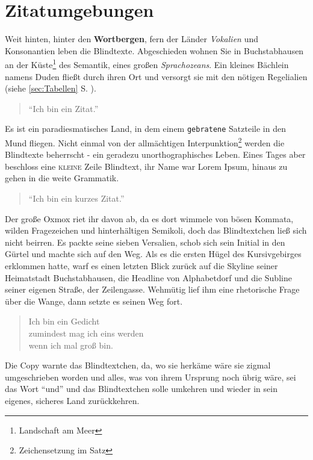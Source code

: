 \documentclass[%
	12pt,%
	a4paper,%
	oneside,%
 liststotoc, idxtotoc, bibtotoc, %
	halfparskip,%
	nochapterprefix,%
	appendixprefix, %
smallheadings,%
]{scrreprt}
\begin{document}
\chapter{Zitatumgebungen}
\label{sec:Zitate}

Weit hinten, hinter den \textbf{Wortbergen}, fern der Länder \textit{Vokalien} und Konsonantien leben die Blindtexte. Abgeschieden wohnen Sie in Buchstabhausen an der Küste\footnote{Landschaft am Meer}
des Semantik, eines großen \textsl{Sprachozeans}. Ein kleines Bächlein namens Duden fließt durch ihren Ort und versorgt sie mit den nötigen Regelialien (siehe \ref{sec:Tabellen} S. \pageref{sec:Tabellen}).

\begin{quotation}
	"`Ich bin ein Zitat."'
\end{quotation}

Es ist ein paradiesmatisches Land, in dem einem \texttt{gebratene} Satzteile in den Mund fliegen. Nicht einmal von der allmächtigen Interpunktion\footnote{Zeichensetzung im Satz} werden die Blindtexte beherrscht - ein geradezu unorthographisches Leben. Eines Tages aber beschloss eine \textsc{kleine} Zeile Blindtext, ihr Name war Lorem Ipsum, hinaus zu gehen in die weite Grammatik. \begin{quote}"`Ich bin ein kurzes Zitat."'\end{quote} Der große Oxmox riet ihr davon ab, da es dort wimmele von bösen Kommata, wilden Fragezeichen und hinterhältigen Semikoli, doch das Blindtextchen ließ sich nicht beirren. Es packte seine sieben Versalien, schob sich sein Initial in den Gürtel und machte sich auf den Weg. Als es die ersten Hügel des Kursivgebirges erklommen hatte, warf es einen letzten Blick zurück auf die Skyline seiner Heimatstadt Buchstabhausen, die Headline von Alphabetdorf und die Subline seiner eigenen Straße, der Zeilengasse. Wehmütig lief ihm eine rhetorische Frage über die Wange, dann setzte es seinen Weg fort.

\begin{verse}
	Ich bin ein Gedicht\\
	zumindest mag ich eins werden\\
	wenn ich mal groß bin.
\end{verse}

Die Copy warnte das Blindtextchen, da, wo sie herkäme wäre sie zigmal umgeschrieben worden und alles, was von ihrem Ursprung noch übrig wäre, sei das Wort "`und"'  und das Blindtextchen solle umkehren und wieder in sein eigenes, sicheres Land zurückkehren.
\end{document}
